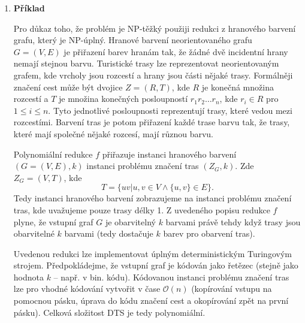 \documentclass[a4paper,12pt]{article}
\begin{document}
\begin{enumerate}[label=\textbf{\arabic*}.]
 \item {\bfseries Příklad}
 
 Pro důkaz toho, že problém  je NP-těžký použiji redukci z hranového barvení 
 grafu, který je NP-úplný. Hranové barvení neorientovaného grafu $G = (V, E)$ je přiřazení barev hranám tak, že žádné dvě incidentní
 hrany nemají stejnou barvu. Turistické trasy lze reprezentovat neorientovaným grafem, kde vrcholy jsou rozcestí a hrany jsou 
 části nějaké trasy. Formálněji značení cest může být dvojice $Z = (R, T)$, kde $R$ je konečná množina rozcestí a $T$ je množina
 konečných posloupností $r_1r_2\dots r_n$, kde $r_i \in R$ pro $1 \leq i \leq n$. Tyto jednotlivé posloupnosti reprezentují 
 trasy, které vedou mezi rozcestími. Barvení tras je potom přiřazení každé trase barvu tak, že trasy, které mají společné nějaké
 rozcesí, mají různou barvu. 
 
 Polynomiální redukce $f$ přiřazuje instanci hranového barvení $(G = (V,E), k)$ instanci problému značení tras $(Z_G, k)$.
 Zde $Z_G = (V, T)$, kde $$T = \{uv | u, v \in V \wedge \{u,v\} \in E \}.$$ Tedy instanci hranového barvení zobrazujeme
 na instanci problému značení tras, kde uvažujeme pouze trasy délky 1. Z uvedeného popisu redukce $f$ plyne, že
 vstupní graf $G$ je obarvitelný $k$ barvami právě tehdy když trasy jsou obarvitelné $k$ barvami (tedy dostačuje $k$ barev 
 pro obarvení tras).
 
 Uvedenou redukci lze implementovat úplným deterministickým Turingovým strojem. Předpokládejme, že vstupní graf je kódován jako
 řetězec (stejně jako hodnota $k$ -- např. v bin. kódu). Kódovanou instanci problému značení tras lze pro 
 vhodné kódování vytvořit v čase $\mathcal{O}(n)$ (kopírování vstupu na pomocnou pásku, úprava do kódu značení cest 
 a okopírování zpět na první pásku). Celková složitost DTS je tedy polynomiální.
 

\end{enumerate}
\end{document}
